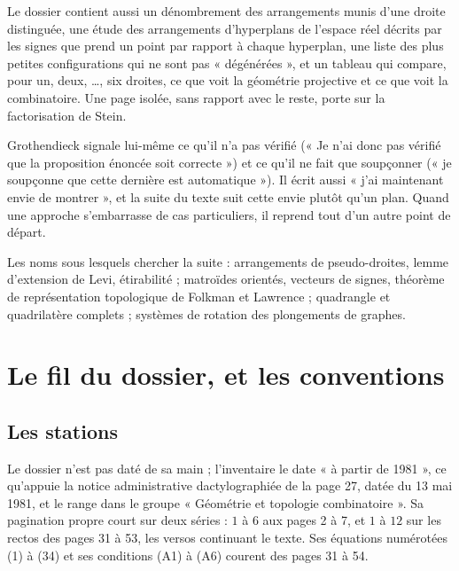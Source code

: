 \documentclass[11pt,a4paper]{article}
\begin{document}
\begin{resume}
Le dossier contient aussi un dénombrement des arrangements munis d'une droite
distinguée, une étude des arrangements d'hyperplans de l'espace réel
décrits par les signes que prend un point par rapport à chaque hyperplan, une
liste des plus petites configurations qui ne sont pas « dégénérées », et
un tableau qui compare, pour un, deux, \ldots, six droites, ce que voit la
géométrie projective et ce que voit la combinatoire. Une page isolée, sans
rapport avec le reste, porte sur la factorisation de Stein.

Grothendieck signale lui-même ce qu'il
n'a pas vérifié (« Je n'ai donc pas vérifié que la proposition énoncée
soit correcte ») et ce qu'il ne fait que soupçonner (« je soupçonne
que cette dernière est automatique »). Il écrit aussi « j'ai maintenant envie
de montrer », et la suite du texte suit cette envie plutôt qu'un plan. Quand
une approche s'embarrasse de cas particuliers, il reprend tout d'un autre
point de départ.

Les noms sous lesquels chercher la suite : arrangements de pseudo-droites,
lemme d'extension de Levi, étirabilité ; matroïdes orientés, vecteurs de
signes, théorème de représentation topologique de Folkman et Lawrence ;
quadrangle et quadrilatère complets ; systèmes de rotation des plongements
de graphes.

\end{resume}

\section*{Le fil du dossier, et les conventions}

\subsection*{Les stations}

Le dossier n'est pas daté de sa main ; l'inventaire le date « à partir de
1981 », ce qu'appuie la notice administrative dactylographiée de la page 27,
datée du 13 mai 1981, et le range dans le groupe « Géométrie et topologie
combinatoire ». Sa pagination propre court sur deux séries : $1$ à $6$ aux
pages 2 à 7, et $1$ à $12$ sur les rectos des pages 31 à 53, les versos
continuant le texte. Ses équations numérotées (1) à (34) et ses conditions
(A1) à (A6) courent des pages 31 à 54.
\end{document}

